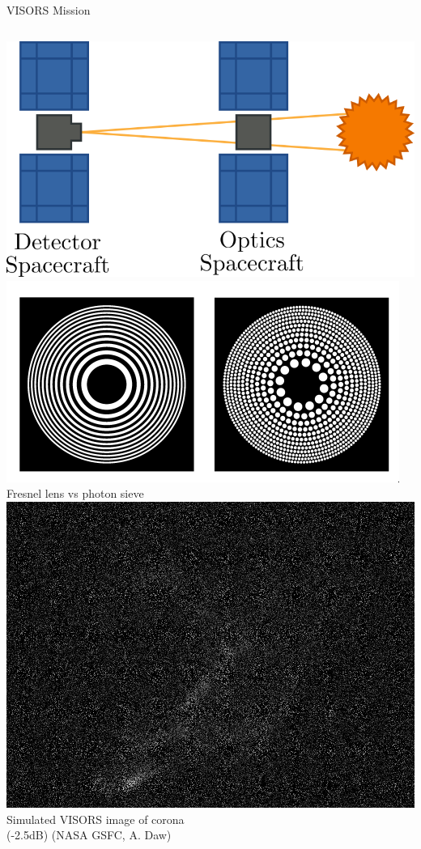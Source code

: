 \documentclass[10pt,xcolor=dvipsnames]{beamer}
\begin{document}
\begin{frame}{VISORS Mission}
\begin{columns}
    \begin{column}{0.5 \textwidth}
      \begin{overprint}
        \includegraphics[width=\textwidth]{figures/visors.png}
        \includegraphics[width=\textwidth]{figures/fresnel.png}
        \\ \small Fresnel lens vs photon sieve
        \includegraphics[width=\textwidth]{figures/sample.png}
        \\ \small Simulated VISORS image of corona \\ (-2.5dB) (NASA GSFC, A. Daw)

      \end{overprint}
    \end{column}
  \end{columns}
\end{frame}
\end{document}
